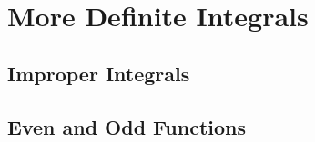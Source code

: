 \section{More Definite Integrals}

\subsection{Improper Integrals}


\subsection{Even and Odd Functions}

